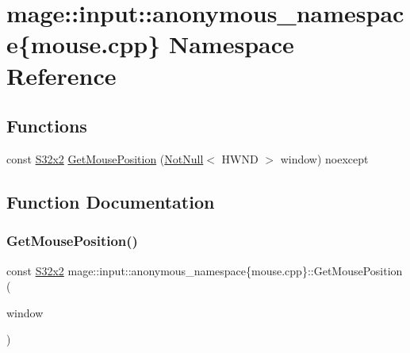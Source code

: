 \hypertarget{namespacemage_1_1input_1_1anonymous__namespace_02mouse_8cpp_03}{}\section{mage\+:\+:input\+:\+:anonymous\+\_\+namespace\{mouse.\+cpp\} Namespace Reference}
\label{namespacemage_1_1input_1_1anonymous__namespace_02mouse_8cpp_03}
\subsection*{Functions}
\begin{DoxyCompactItemize}
\item 
const \mbox{\hyperlink{namespacemage_a4843c424aae7bb5fb6c440ed6ed593ee}{S32x2}} \mbox{\hyperlink{namespacemage_1_1input_1_1anonymous__namespace_02mouse_8cpp_03_a0bfbce60832af3992580d0f8bedd30fe}{Get\+Mouse\+Position}} (\mbox{\hyperlink{namespacemage_a8769f9d670d6b585ea306cb1062af94b}{Not\+Null}}$<$ H\+W\+ND $>$ window) noexcept
\end{DoxyCompactItemize}


\subsection{Function Documentation}
\mbox{\label{namespacemage_1_1input_1_1anonymous__namespace_02mouse_8cpp_03_a0bfbce60832af3992580d0f8bedd30fe}} 
\subsubsection{\texorpdfstring{Get\+Mouse\+Position()}{GetMousePosition()}}
{\footnotesize\ttfamily const \mbox{\hyperlink{namespacemage_a4843c424aae7bb5fb6c440ed6ed593ee}{S32x2}} mage\+::input\+::anonymous\+\_\+namespace\{mouse.\+cpp\}\+::Get\+Mouse\+Position (\begin{DoxyParamCaption}\item[{\mbox{\hyperlink{namespacemage_a8769f9d670d6b585ea306cb1062af94b}{Not\+Null}}$<$ H\+W\+ND $>$}]{window }\end{DoxyParamCaption})\hspace{0.3cm}{\ttfamily [noexcept]}}

